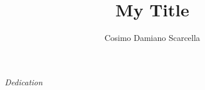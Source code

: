 \documentclass[12pt,a4paper]{book}
\author{Cosimo Damiano Scarcella}
\title{My Title}
\date{}
\begin{document}

\newpage\null\thispagestyle{empty}\newpage %

\maketitle
\newpage\null\thispagestyle{empty}\newpage %

\frontmatter
{}
\begin{flushright}
\null{}
\textit{Dedication}
\null
\end{flushright}
\newpage
\newpage


\mainmatter


\appendix 


\listoffigures
\listoftables 

\frontmatter
{}
\nocite{*}



\tableofcontents
\end{document}
